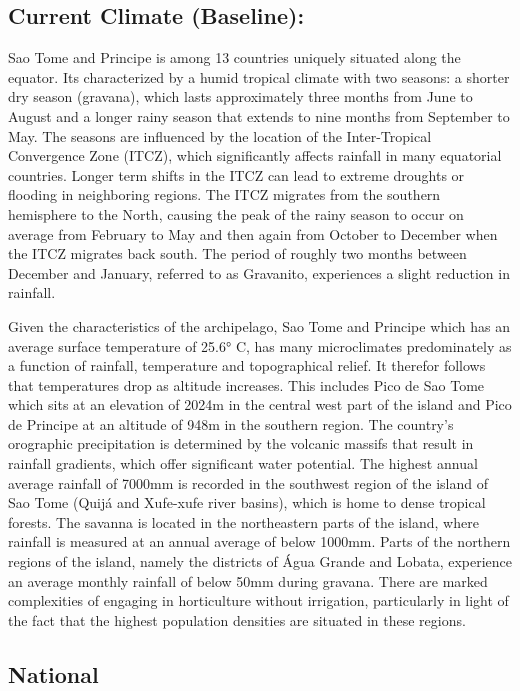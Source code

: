 \documentclass[
]{book}
\begin{document}
\hypertarget{current-climate-baseline}{%
\subsection{Current Climate (Baseline):}\label{current-climate-baseline}}

Sao Tome and Principe is among 13 countries uniquely situated along the equator. Its characterized by a humid tropical climate with two seasons: a shorter dry season (gravana), which lasts approximately three months from June to August and a longer rainy season that extends to nine months from September to May. The seasons are influenced by the location of the Inter-Tropical Convergence Zone (ITCZ), which significantly affects rainfall in many equatorial countries. Longer term shifts in the ITCZ can lead to extreme droughts or flooding in neighboring regions. The ITCZ migrates from the southern hemisphere to the North, causing the peak of the rainy season to occur on average from February to May and then again from October to December when the ITCZ migrates back south. The period of roughly two months between December and January, referred to as Gravanito, experiences a slight reduction in rainfall.

Given the characteristics of the archipelago, Sao Tome and Principe which has an average surface temperature of 25.6° C, has many microclimates predominately as a function of rainfall, temperature and topographical relief. It therefor follows that temperatures drop as altitude increases. This includes Pico de Sao Tome which sits at an elevation of 2024m in the central west part of the island and Pico de Principe at an altitude of 948m in the southern region. The country's orographic precipitation is determined by the volcanic massifs that result in rainfall gradients, which offer significant water potential. The highest annual average rainfall of 7000mm is recorded in the southwest region of the island of Sao Tome (Quijá and Xufe-xufe river basins), which is home to dense tropical forests. The savanna is located in the northeastern parts of the island, where rainfall is measured at an annual average of below 1000mm. Parts of the northern regions of the island, namely the districts of Água Grande and Lobata, experience an average monthly rainfall of below 50mm during gravana. There are marked complexities of engaging in horticulture without irrigation, particularly in light of the fact that the highest population densities are situated in these regions.

\hypertarget{national}{%
\subsection{National}\label{national}}
\end{document}
